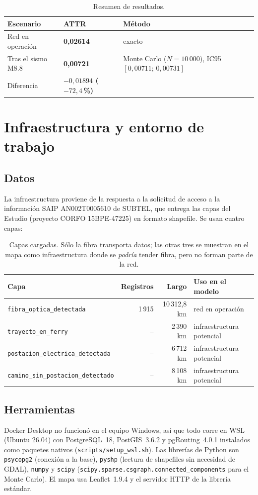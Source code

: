 \documentclass[11pt,a4paper]{article}
\newcommand{\cod}[1]{\texttt{#1}}
\begin{document}
\begin{table}[h]
\centering
\small
\begin{tabular}{lll}
\toprule
Escenario & ATTR & Método \\
\midrule
Red en operación & \textbf{0,02614} & exacto \\
Tras el sismo M8.8 & \textbf{0,00721} & Monte Carlo ($N=10\,000$), IC95 $[0{,}00711;\,0{,}00731]$ \\
Diferencia & \textbf{$-0{,}01894$ ($-72{,}4$\,\%)} & \\
\bottomrule
\end{tabular}
\caption{Resumen de resultados.}
\end{table}

\section{Infraestructura y entorno de trabajo}
\subsection{Datos}
La infraestructura proviene de la respuesta a la solicitud de acceso a la información SAIP
AN002T0005610 de SUBTEL, que entrega las capas del Estudio (proyecto CORFO 15BPE-47225) en formato
shapefile. Se usan cuatro capas:

\begin{table}[h]
\centering
\begin{tabular}{lrrl}
\toprule
Capa & Registros & Largo & Uso en el modelo \\
\midrule
\cod{fibra\_optica\_detectada} & 1\,915 & 10\,312,8 km & red en operación \\
\cod{trayecto\_en\_ferry} & -- & 2\,390 km & infraestructura potencial \\
\cod{postacion\_electrica\_detectada} & -- & 6\,712 km & infraestructura potencial \\
\cod{camino\_sin\_postacion\_detectado} & -- & 8\,108 km & infraestructura potencial \\
\bottomrule
\end{tabular}
\caption{Capas cargadas. Sólo la fibra transporta datos; las otras tres se muestran en el mapa como
infraestructura donde se \emph{podría} tender fibra, pero no forman parte de la red.}
\end{table}

\subsection{Herramientas}
Docker Desktop no funcionó en el equipo Windows, así que todo corre en WSL (Ubuntu 26.04) con
PostgreSQL~18, PostGIS~3.6.2 y pgRouting~4.0.1 instalados como paquetes nativos
(\cod{scripts/setup\_wsl.sh}). Las librerías de Python son \cod{psycopg2} (conexión a la base),
\cod{pyshp} (lectura de shapefiles sin necesidad de GDAL), \cod{numpy} y \cod{scipy}
(\cod{scipy.sparse.csgraph.connected\_components} para el Monte Carlo). El mapa usa Leaflet~1.9.4 y
el servidor HTTP de la librería estándar.
\end{document}

